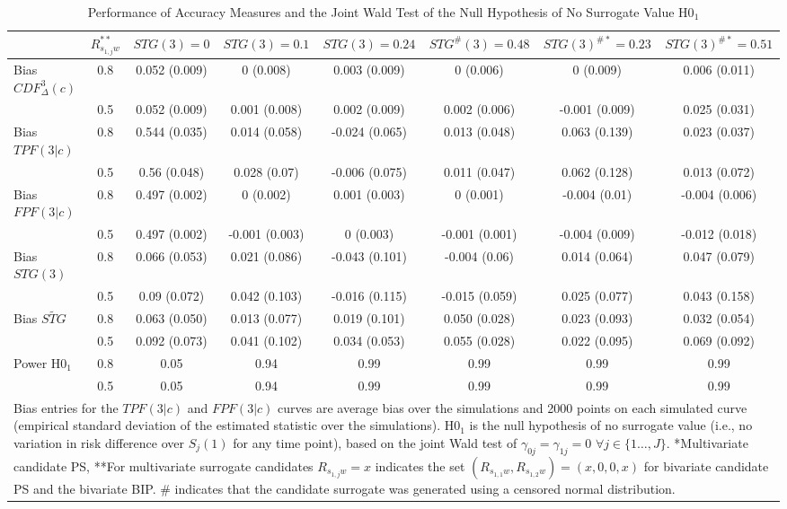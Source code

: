\documentclass[times, doublespace]{simauth}
\begin{document}
\begin{table}
\begin{center}
\caption{Performance of Accuracy Measures and the Joint Wald Test of the Null Hypothesis of No Surrogate Value H0$_1$ \label{Bias}}
\begin{tabular}{lccccccc}
  \hline
&$R_{s_{1,j}w}^{**}$&$STG(3)=0$ & $STG(3)=0.1$  & $STG(3)=0.24$  & $STG^{\#}(3)=0.48$&$STG(3)^{\#*}=0.23$&$STG(3)^{\#*}=0.51$\\ 
  \hline
Bias $CDF^{3}_{\Delta}(c)$& 0.8& 0.052 (0.009) & 0 (0.008) & 0.003 (0.009) & 0 (0.006) & 0 (0.009) & 0.006 (0.011) \\ 
 &0.5& 0.052 (0.009) & 0.001 (0.008) & 0.002 (0.009) & 0.002 (0.006) & -0.001 (0.009) & 0.025 (0.031) \\ 
Bias $TPF(3|c)$& 0.8& 0.544 (0.035) & 0.014 (0.058) & -0.024 (0.065) & 0.013 (0.048) & 0.063 (0.139) & 0.023 (0.037) \\ 
 &0.5& 0.56 (0.048) & 0.028 (0.07) & -0.006 (0.075) & 0.011 (0.047) & 0.062 (0.128) & 0.013 (0.072) \\ 
Bias $FPF(3|c)$& 0.8& 0.497 (0.002) & 0 (0.002) & 0.001 (0.003) & 0 (0.001) & -0.004 (0.01) & -0.004 (0.006) \\ 
 &0.5& 0.497 (0.002) & -0.001 (0.003) & 0 (0.003) & -0.001 (0.001) & -0.004 (0.009) & -0.012 (0.018) \\ 
Bias $STG(3)$& 0.8& 0.066 (0.053) & 0.021 (0.086) & -0.043 (0.101) & -0.004 (0.06) & 0.014 (0.064) & 0.047 (0.079) \\
  &0.5 & 0.09 (0.072) & 0.042 (0.103) & -0.016 (0.115) & -0.015 (0.059) & 0.025 (0.077) & 0.043 (0.158) \\ 
Bias $\widetilde{STG}$ & 0.8 & 0.063 (0.050)& 0.013 (0.077)& 0.019 (0.101)& 0.050 (0.028) & 0.023 (0.093) & 0.032 (0.054) \\
 & 0.5 & 0.092 (0.073) & 0.041 (0.102) & 0.034 (0.053)& 0.055 (0.028)& 0.022 (0.095) & 0.069 (0.092) \\
Power H0$_1$& 0.8& 0.05 & 0.94 & 0.99 & 0.99 & 0.99 & 0.99 \\ 
  &0.5& 0.05 & 0.94 & 0.99 & 0.99 & 0.99 & 0.99 \\ 
   \hline
\multicolumn{8}{p{9in}}{Bias entries for the $TPF(3|c)$ and $FPF(3|c)$ curves are average bias over the simulations and 2000 points on each simulated curve (empirical standard deviation of the estimated statistic over the simulations). H0$_1$ is the null hypothesis of no surrogate value (i.e., no variation in risk difference over $S_j(1)$ for any time point), based on the joint Wald test of $\gamma_{0j}=\gamma_{1j}=0$ $\forall j\in\{1\ldots,J\}$. *Multivariate candidate PS, **For multivariate surrogate candidates $R_{s_{1,j}w}=x$ indicates the set $(R_{s_{1,1}w},R_{s_{1,2}w})=(x,0,0,x)$ for bivariate candidate PS and the bivariate BIP. \# indicates that the candidate surrogate was generated using a censored normal distribution.}
\end{tabular}
\end{center}
\end{table}
\end{document}
